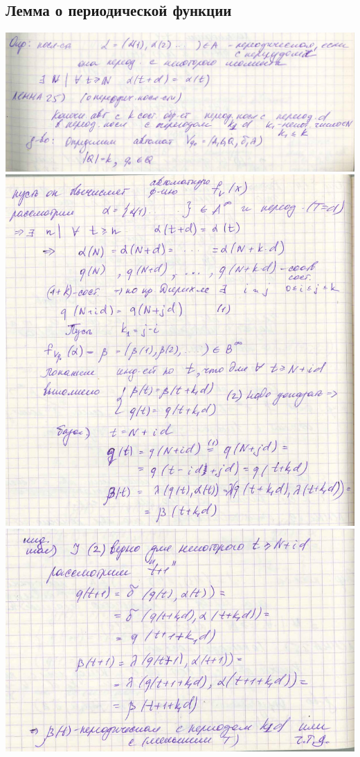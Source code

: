 \documentclass[12pt]{article}
\begin{document}
\subsection{Лемма о периодической функции}
	\includegraphics[width=500pt]{37}\\
	\includegraphics[width=500pt]{38}\\
	\includegraphics[width=500pt]{39}
\end{document}
